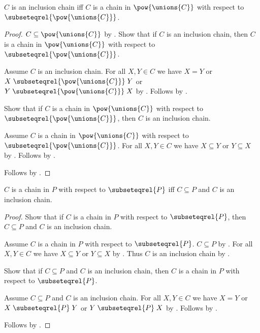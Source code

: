 \begin{proposition}\label{inclusion_chain_as_relation_chain}
    $C$ is an inclusion chain iff
        $C$ is a chain in $\pow{\unions{C}}$ with respect to
            $\subseteqrel{\pow{\unions{C}}}$.
\end{proposition}
\begin{proof}
    $C\subseteq\pow{\unions{C}}$
        by .
    Show that if $C$ is an inclusion chain, then $C$ is a chain in
        $\pow{\unions{C}}$ with respect to
        $\subseteqrel{\pow{\unions{C}}}$.
    \begin{subproof}
        Assume $C$ is an inclusion chain.
        For all $X,Y\in C$ we have $X=Y$ or
            $X\mathrel{\subseteqrel{\pow{\unions{C}}}}Y$ or
            $Y\mathrel{\subseteqrel{\pow{\unions{C}}}}X$
            by .
        Follows by .
    \end{subproof}
    Show that if $C$ is a chain in $\pow{\unions{C}}$ with respect to
        $\subseteqrel{\pow{\unions{C}}}$, then $C$ is an inclusion chain.
    \begin{subproof}
        Assume $C$ is a chain in $\pow{\unions{C}}$ with respect to
            $\subseteqrel{\pow{\unions{C}}}$.
        For all $X,Y\in C$ we have $X\subseteq Y$ or $Y\subseteq X$
            by .
        Follows by .
    \end{subproof}
    Follows by \auto.
\end{proof}

\begin{proposition}\label{inclusion_chain_in_family_iff}
    $C$ is a chain in $P$ with respect to $\subseteqrel{P}$ iff
        $C\subseteq P$ and $C$ is an inclusion chain.
\end{proposition}
\begin{proof}
    Show that if $C$ is a chain in $P$ with respect to $\subseteqrel{P}$,
        then $C\subseteq P$ and $C$ is an inclusion chain.
    \begin{subproof}
        Assume $C$ is a chain in $P$ with respect to $\subseteqrel{P}$.
        $C\subseteq P$ by .
        For all $X,Y\in C$ we have $X\subseteq Y$ or $Y\subseteq X$
            by .
        Thus $C$ is an inclusion chain by .
    \end{subproof}
    Show that if $C\subseteq P$ and $C$ is an inclusion chain,
        then $C$ is a chain in $P$ with respect to $\subseteqrel{P}$.
    \begin{subproof}
        Assume $C\subseteq P$ and $C$ is an inclusion chain.
        For all $X,Y\in C$ we have
            $X=Y$ or $X\mathrel{\subseteqrel{P}}Y$ or
                $Y\mathrel{\subseteqrel{P}}X$
            by .
        Follows by .
    \end{subproof}
    Follows by \auto.
\end{proof}

